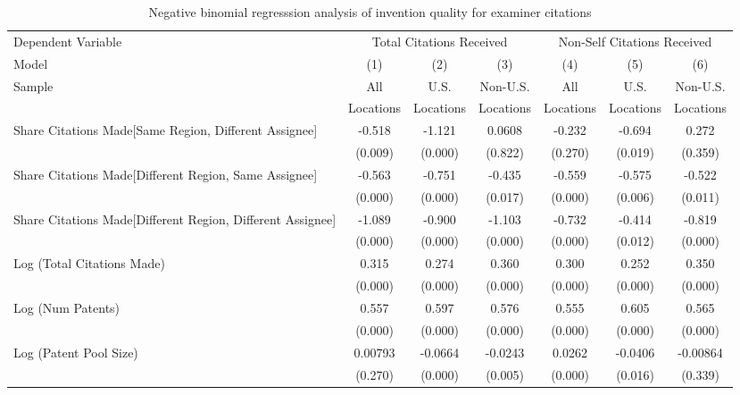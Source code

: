 \begin{sidewaystable}[htbp]\centering \caption{Negative binomial regresssion analysis of invention quality for examiner citations  \label{e.model123192021}} \begin{tabular}{l*{6}{c}} \hline\hline
 Dependent Variable&\multicolumn{3}{c}{Total Citations Received}&\multicolumn{3}{c}{Non-Self Citations Received}\\
                Model&\multicolumn{1}{c}{(1)}&\multicolumn{1}{c}{(2)}&\multicolumn{1}{c}{(3)}&\multicolumn{1}{c}{(4)}&\multicolumn{1}{c}{(5)}&\multicolumn{1}{c}{(6)}\\
                 \hline
 \multirow{2}{*}{Sample}&\multicolumn{1}{c}{All}&\multicolumn{1}{c}{U.S.}&\multicolumn{1}{c}{Non-U.S.}&\multicolumn{1}{c}{All}&\multicolumn{1}{c}{U.S.}&\multicolumn{1}{c}{Non-U.S.}\\       
  &\multicolumn{1}{c}{Locations}&\multicolumn{1}{c}{Locations}&\multicolumn{1}{c}{Locations}&\multicolumn{1}{c}{Locations}&\multicolumn{1}{c}{Locations}&\multicolumn{1}{c}{Locations}\\ 
\hline
Share Citations Made[Same Region, Different Assignee]&   -0.518&   -1.121&   0.0608&   -0.232&   -0.694&    0.272\\
                &  (0.009)&  (0.000)&  (0.822)&  (0.270)&  (0.019)&  (0.359)\\
Share Citations Made[Different Region, Same Assignee]&   -0.563&   -0.751&   -0.435&   -0.559&   -0.575&   -0.522\\
                &  (0.000)&  (0.000)&  (0.017)&  (0.000)&  (0.006)&  (0.011)\\
Share Citations Made[Different Region, Different Assignee]&   -1.089&   -0.900&   -1.103&   -0.732&   -0.414&   -0.819\\
                &  (0.000)&  (0.000)&  (0.000)&  (0.000)&  (0.012)&  (0.000)\\
Log (Total Citations Made)&    0.315&    0.274&    0.360&    0.300&    0.252&    0.350\\
                &  (0.000)&  (0.000)&  (0.000)&  (0.000)&  (0.000)&  (0.000)\\
Log (Num Patents)&    0.557&    0.597&    0.576&    0.555&    0.605&    0.565\\
                &  (0.000)&  (0.000)&  (0.000)&  (0.000)&  (0.000)&  (0.000)\\
Log (Patent Pool Size)&  0.00793&  -0.0664&  -0.0243&   0.0262&  -0.0406& -0.00864\\
                &  (0.270)&  (0.000)&  (0.005)&  (0.000)&  (0.016)&  (0.339)\\

\end{tabular}
\end{sidewaystable}
